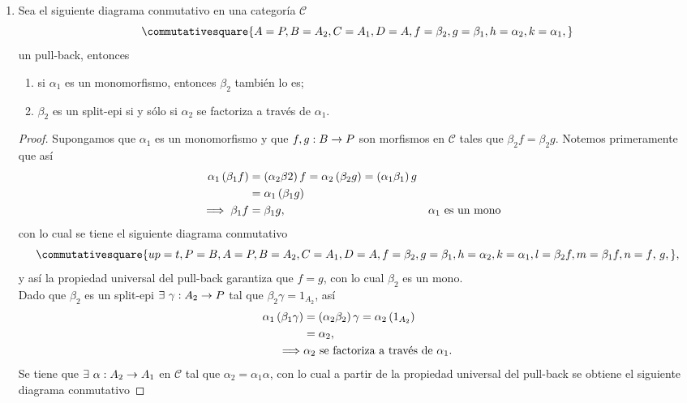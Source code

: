 \documentclass{article}
\begin{document}
\begin{enumerate}[label=\textbf{Ej \arabic*.}]
\begin{proof}
		\end{proof} 
		\item Sea el siguiente diagrama conmutativo en una categoría $\mathscr{C}$
		\begin{equation*}
			\commutativesquare{A=P,B=A_2,C=A_1,D=A,f=\beta_2,g=\beta_1,h=\alpha_2,k=\alpha_1,}
		\end{equation*}
		un pull-back, entonces
		\begin{enumerate}
			\item si $\alpha_1$ es un monomorfismo, entonces $\beta_2$ también lo es;
			\item $\beta_2$ es un split-epi si y sólo si $\alpha_2$ se factoriza a través de $\alpha_1$.
		\end{enumerate}
		\begin{proof}
			 Supongamos que $\alpha_1$ es un monomorfismo y que $f,g:B\to P$ son morfismos en $\mathscr{C}$ tales que $\beta_2 f=\beta_2 g$. Notemos primeramente que así
			\begin{align*}
				\alpha_1\left(\beta_1 f\right)&=\left(\alpha_2\beta 2\right)f=\alpha_2\left(\beta_2 g\right)=\left(\alpha_1\beta_1\right)g\\
				&=\alpha_1\left(\beta_1 g\right)\\
				\implies \beta_1 f&=\beta_1 g, && \alpha_1\text{ es un mono}
			\end{align*}
			con lo cual se tiene el siguiente diagrama conmutativo
			\begin{equation*}
				\commutativesquare{up=t,P=B,A=P,B=A_2,C=A_1,D=A,f=\beta_2,g=\beta_1,h=\alpha_2,k=\alpha_1,l=\beta_2 f,m=\beta_1 f,n=f\text{, }g,},
			\end{equation*}
		y así la propiedad universal del pull-back garantiza que $f=g$, con lo cual $\beta_2$ es un mono.\\
		 Dado que $\beta_2$ es un split-epi $\exists\ \catarrow{\gamma}{A_2}{P}$ tal que $\beta_2\gamma=1_{A_2}$, así
		\begin{align*}
			\alpha_1\left(\beta_1\gamma\right)&=\left(\alpha_2\beta_2\right)\gamma=\alpha_2\left(1_{A_2}\right)\\
			&=\alpha_2,\\
			\implies &\alpha_2\text{ se factoriza a través de }\alpha_1.
		\end{align*}
		 Se tiene que $\exists\ \catarrow{\alpha}{A_2}{A_1}$ en $\mathscr{C}$ tal que $\alpha_2=\alpha_1\alpha$, con lo cual a partir de la propiedad universal del pull-back se obtiene el siguiente diagrama conmutativo

\end{proof}
\end{enumerate}
\end{document}
